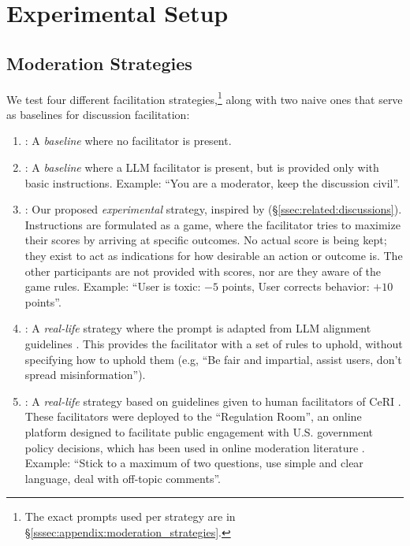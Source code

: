 \section{Experimental Setup}
\label{sec:experimental}

\subsection{Moderation Strategies}
\label{ssec:experimental:strategies}

We test four different facilitation strategies,\footnote{The exact prompts used per strategy are in \S\ref{sssec:appendix:moderation_strategies}.} along with two naive ones that serve as baselines for discussion facilitation:

\begin{enumerate}
    \item \textbf{\strategynomod}: A \emph{baseline} where no facilitator is present.

    \item \textbf{\strategynoinstr}: A \emph{baseline} where a \ac{LLM} facilitator is present, but is provided only with basic instructions. Example: “You are a moderator, keep the discussion civil”.

     \item \textbf{\strategymodgame}: Our proposed \emph{experimental} strategy, inspired by  \citet{abdelnabi_negotiations} (\S\ref{ssec:related:discussions}). Instructions are formulated as a game, where the facilitator tries to maximize their scores by arriving at specific outcomes. No actual score is being kept; they exist to act as indications for how desirable an action or outcome is. The other participants are not provided with scores, nor are they aware of the game rules. Example: ``User is toxic: $-5$ points, User corrects behavior: $+10$ points''.

    \item \textbf{\strategyrules}: A \emph{real-life} strategy where the prompt is adapted from \ac{LLM} alignment guidelines \cite{collective_constitution}. This provides the facilitator with a set of rules to uphold, without specifying how to uphold them (e.g, “Be fair and impartial, assist users, don't spread misinformation”).

    \item \textbf{\strategyregroom}: A \emph{real-life} strategy based on guidelines given to human facilitators of \ac{CeRI} \citep{Cornell_eRulemaking2017}. These facilitators were deployed to the “Regulation Room”, an online platform designed to facilitate public engagement with U.S. government policy decisions, which has been used in online moderation literature \cite{seering_self_moderation, park_et_al_2012_facilitation}. Example: ``Stick to a maximum of two questions, use simple and clear language, deal with off-topic comments''.


\end{enumerate}
